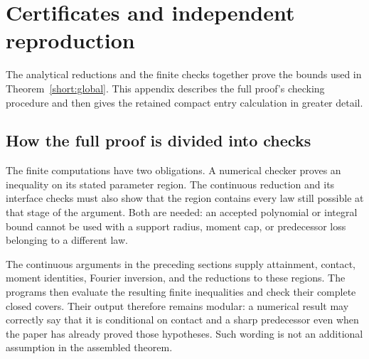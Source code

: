 \section{Certificates and independent reproduction}
\label{revision:reproducibility}
The analytical reductions and the finite checks together prove the
bounds used in Theorem~\ref{short:global}. This appendix describes the
full proof's checking procedure and then gives the retained compact
entry calculation in greater detail.

\subsection{How the full proof is divided into checks}
\label{revision:extension-reproduction}
The finite computations have two obligations. A numerical checker proves an
inequality on its stated parameter region. The continuous reduction and its interface checks must also show
that the region contains every law still possible at that stage of the
argument. Both are needed: an accepted polynomial or integral bound cannot be
used with a support radius, moment cap, or predecessor loss belonging to a
different law.

The continuous arguments in the preceding sections supply attainment,
contact, moment identities, Fourier inversion, and the reductions to these
regions. The programs then evaluate the resulting finite inequalities and
check their complete closed covers. Their output therefore remains modular:
a numerical result may correctly say that it is conditional on contact and a
sharp predecessor even when the paper has already proved those hypotheses.
Such wording is not an additional assumption in the assembled theorem.

